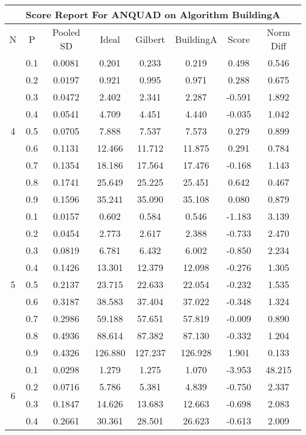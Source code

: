 \documentclass[11pt,a4paper]{report}
\begin{document}
\begin{longtable}{ | c | c || c | c | c | c | c | c | }
\hline
\multicolumn{8}{|c|}{ Score Report For ANQUAD on Algorithm BuildingA} \\
\hline
N & P & Pooled SD &  Ideal &  Gilbert & BuildingA  & Score & Norm Diff \\
 \hline
 \hline
 \endhead
\multirow{9}{*}{4} & 0.1 & 0.0081 & 0.201 & 0.233 & 0.219 & 0.498 & 0.546 \\
 & 0.2 & 0.0197 & 0.921 & 0.995 & 0.971 & 0.288 & 0.675 \\
 & 0.3 & 0.0472 & 2.402 & 2.341 & 2.287 & -0.591 & 1.892 \\
 & 0.4 & 0.0541 & 4.709 & 4.451 & 4.440 & -0.035 & 1.042 \\
 & 0.5 & 0.0705 & 7.888 & 7.537 & 7.573 & 0.279 & 0.899 \\
 & 0.6 & 0.1131 & 12.466 & 11.712 & 11.875 & 0.291 & 0.784 \\
 & 0.7 & 0.1354 & 18.186 & 17.564 & 17.476 & -0.168 & 1.143 \\
 & 0.8 & 0.1741 & 25.649 & 25.225 & 25.451 & 0.642 & 0.467 \\
 & 0.9 & 0.1596 & 35.241 & 35.090 & 35.108 & 0.080 & 0.879 \\
 \hline
\multirow{9}{*}{5} & 0.1 & 0.0157 & 0.602 & 0.584 & 0.546 & -1.183 & 3.139 \\
 & 0.2 & 0.0454 & 2.773 & 2.617 & 2.388 & -0.733 & 2.470 \\
 & 0.3 & 0.0819 & 6.781 & 6.432 & 6.002 & -0.850 & 2.234 \\
 & 0.4 & 0.1426 & 13.301 & 12.379 & 12.098 & -0.276 & 1.305 \\
 & 0.5 & 0.2137 & 23.715 & 22.633 & 22.054 & -0.232 & 1.535 \\
 & 0.6 & 0.3187 & 38.583 & 37.404 & 37.022 & -0.348 & 1.324 \\
 & 0.7 & 0.2986 & 59.188 & 57.651 & 57.819 & -0.009 & 0.890 \\
 & 0.8 & 0.4936 & 88.614 & 87.382 & 87.130 & -0.332 & 1.204 \\
 & 0.9 & 0.4326 & 126.880 & 127.237 & 126.928 & 1.901 & 0.133 \\
 \hline
\multirow{9}{*}{6} & 0.1 & 0.0298 & 1.279 & 1.275 & 1.070 & -3.953 & 48.215 \\
 & 0.2 & 0.0716 & 5.786 & 5.381 & 4.839 & -0.750 & 2.337 \\
 & 0.3 & 0.1847 & 14.626 & 13.683 & 12.663 & -0.698 & 2.083 \\
 & 0.4 & 0.2661 & 30.361 & 28.501 & 26.623 & -0.613 & 2.009 \\

\end{longtable}
\end{document}
